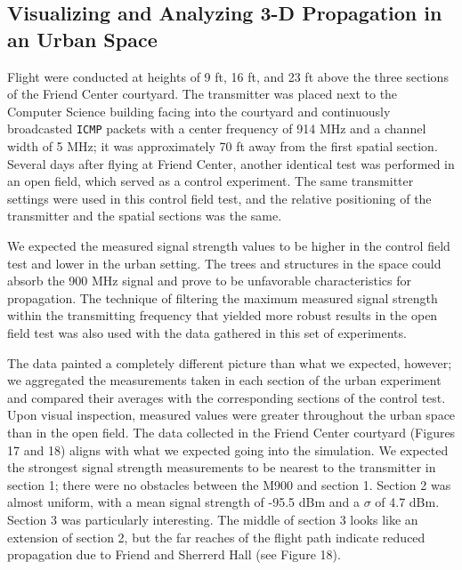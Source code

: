 \documentclass[pageno]{jpaper}
\begin{document}
\subsection{Visualizing and Analyzing 3-D Propagation in an Urban Space}
Flight were conducted at heights of 9 ft, 16 ft, and 23 ft above the three sections of the Friend Center courtyard. The transmitter was placed next to the Computer Science building facing into the courtyard and continuously broadcasted \texttt{ICMP} packets with a center frequency of 914 MHz and a channel width of 5 MHz; it was approximately 70 ft away from the first spatial section. Several days after flying at Friend Center, another identical test was performed in an open field, which served as a control experiment. The same transmitter settings were used in this control field test, and the relative positioning of the transmitter and the spatial sections was the same. 

We expected the measured signal strength values to be higher in the control field test and lower in the urban setting. The trees and structures in the space could absorb\cite{reflections} the 900 MHz signal and prove to be unfavorable characteristics for propagation. The technique of filtering the maximum measured signal strength within the transmitting frequency that yielded more robust results in the open field test was also used with the data gathered in this set of experiments. 

The data painted a completely different picture than what we expected, however; we aggregated the measurements taken in each section of the urban experiment and compared their averages with the corresponding sections of the control test. Upon visual inspection, measured values were greater throughout the urban space than in the open field. The data collected in the Friend Center courtyard (Figures 17 and 18) aligns with what we expected going into the simulation. We expected the strongest signal strength measurements to be nearest to the transmitter in section 1; there were no obstacles between the M900 and section 1. Section 2 was almost uniform, with a mean signal strength of -95.5 dBm and a $\sigma$ of 4.7 dBm. Section 3 was particularly interesting. The middle of section 3 looks like an extension of section 2, but the far reaches of the flight path indicate reduced propagation due to Friend and Sherrerd Hall (see Figure 18).
 
\end{document}
